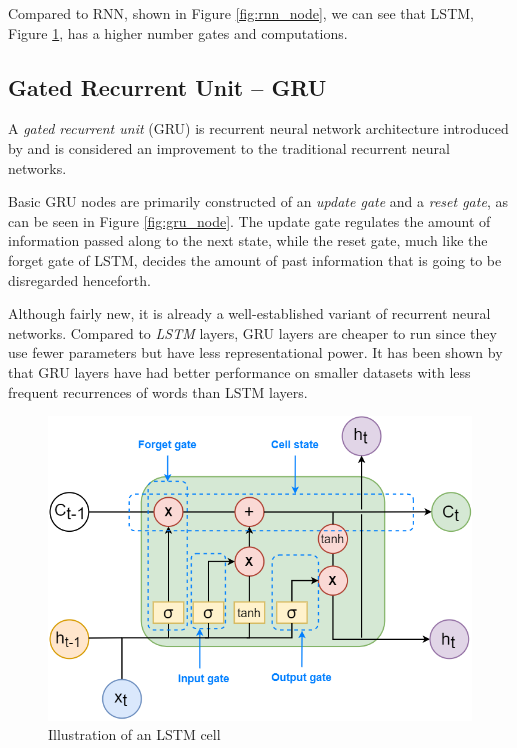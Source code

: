\documentclass[nofilelist]{cslthse-msc}
\begin{document}
Compared to RNN, shown in Figure \ref{fig:rnn_node}, we can see that LSTM, Figure \ref{fig:lstm_node}, has a higher number gates and computations.  




\subsection{Gated Recurrent Unit -- GRU}
\label{GRU}
A \emph{gated recurrent unit} (GRU) is recurrent neural network architecture introduced by \citet{cho2014learning} and is considered an improvement to the traditional recurrent neural networks. 

Basic GRU nodes  are primarily constructed of an \textit{update gate} and a \textit{reset gate}, as can be seen in Figure \ref{fig:gru_node}. The update gate regulates the amount of information passed along to the next state, while the reset gate, much like the forget gate of LSTM, decides the amount of past information that is going to be disregarded henceforth. 

Although fairly new, it is already a well-established variant of recurrent neural networks. Compared to \textit{LSTM} layers, GRU layers are cheaper to run since they use fewer parameters but have less representational power. It has been shown by \citet{Gruber2020AreGC} that GRU layers have had better performance on smaller datasets with less frequent recurrences of words than LSTM layers.


\begin{figure}[!ht]
    \centering
    \includegraphics[scale=0.58]{msccls/explanatory_images/lstm.png}
    \caption{Illustration of an LSTM cell} 
    \label{fig:lstm_node}
\end{figure}
\end{document}
